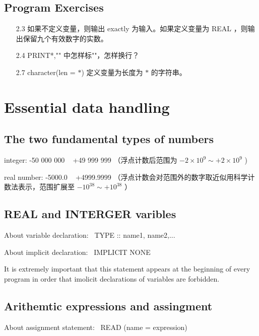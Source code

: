 \documentclass[a4paper,titlepage]{report}
\theoremstyle{definition}
\begin{document}
\section{Program Exercises}

\begin{itemize}
  \item[2.3]
  如果不定义变量，则输出 exactly 为输入。如果定义变量为 REAL ，则输出保留九个有效数字的实数。

  \item[2.4]
  PRINT*,"" 中怎样标""，怎样换行？

  \item[2.7]
  character(len = $*$) 定义变量为长度为 $*$ 的字符串。

\end{itemize}

\chapter{Essential data handling}

\section{The two fundamental types of numbers}

integer: -50 000 000 ~ +49 999 999 （浮点计数后范围为 $-2 \times 10^{9} \sim +2 \times 10^{9}$ ) \par \par
real number: -5000.0 ~ +4999.9999 （浮点计数会对范围外的数字取近似用科学计数法表示，范围扩展至 $-10^{38} \sim +10^{38}$ ）

\section{REAL and INTERGER varibles}

About variable declaration: \ TYPE :: name1, name2,... \par
About implicit declaration: \ IMPLICIT NONE \\
\par
It is extremely important that this statement appears at the beginning of every program in order that imolicit declarations of variables are forbidden.

\section{Arithemtic expressions and assingment}

About assignment statement: \ READ (name = expression) \\
\end{document}
